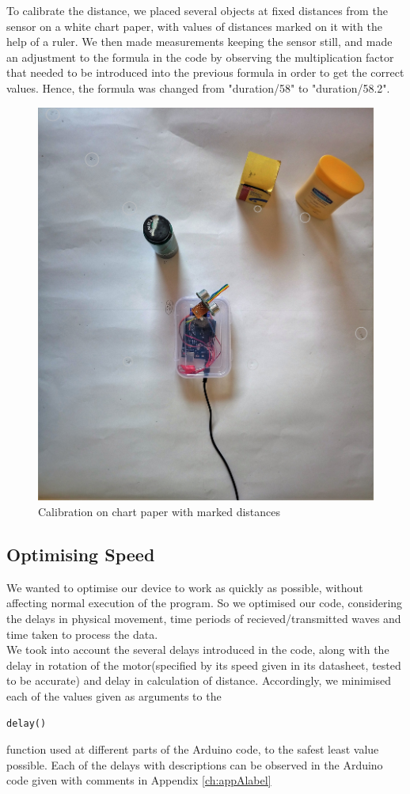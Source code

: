 To calibrate the distance, we placed several objects at fixed distances from the sensor on a white chart paper, with values of distances marked on it with the help of a ruler. We then made measurements keeping the sensor still, and made an adjustment to the formula in the code by observing the multiplication factor that needed to be introduced into the previous formula in order to get the correct values. Hence, the formula was changed from "duration/58" to "duration/58.2".\\
\begin{figure}[H]
	\vfill
	\centering
	\includegraphics[width=\textwidth]{../Files/cabri.jpg}
	\caption{Calibration on chart paper with marked distances}  \label{fig:sermon}
\end{figure}
\subsection{Optimising Speed}
We wanted to optimise our device to work as quickly as possible, without affecting normal execution of the program. So we optimised our code, considering the delays in physical movement, time periods of recieved/transmitted waves and time taken to process the data.\\
We took into account the several delays introduced in the code, along with the delay in rotation of the motor(specified by its speed given in its datasheet, tested to be accurate) and delay in calculation of distance. Accordingly, we minimised each of the values given as arguments to the \begin{verbatim}delay()\end{verbatim} function used at different parts of the Arduino code, to the safest least value possible. Each of the delays with descriptions can be observed in the Arduino code given with comments in Appendix \ref{ch:appAlabel}
